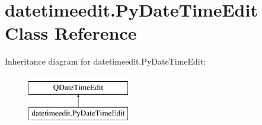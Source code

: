 \hypertarget{classdatetimeedit_1_1PyDateTimeEdit}{}\section{datetimeedit.\+Py\+Date\+Time\+Edit Class Reference}
\label{classdatetimeedit_1_1PyDateTimeEdit}
Inheritance diagram for datetimeedit.\+Py\+Date\+Time\+Edit\+:\begin{figure}[H]
\begin{center}
\leavevmode
\includegraphics[height=2.000000cm]{classdatetimeedit_1_1PyDateTimeEdit}
\end{center}
\end{figure}
